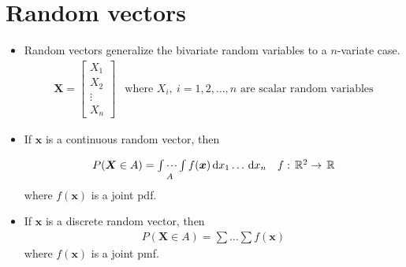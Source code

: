 \documentclass[10pt, twoside, a4paper]{book}
\newcommand{\ud}{\,\mathrm{d}}
\newcommand{\ureal}{\,\mathbb{R}}
\theoremstyle{definition}
\begin{document}
\section{Random vectors}
\begin{itemize}
  \item Random vectors generalize the bivariate random variables to a
  $n$-variate case.
  	\begin{equation*}
	\renewcommand{\arraystretch}{1.6}
	\begin{array}{ll}
	\bm X = \left [
	\begin{matrix}
	X_1 \\ X_2 \\ \vdots \\ X_n
	\end{matrix} \right ] & \text{where $X_i,~i=1,2,\ldots,n$ are scalar random
	variables}
	\end{array}
	\end{equation*}
	\item If $\bm x$ is a continuous random vector, then
	\begin{equation*}
	\renewcommand{\arraystretch}{1.6}
	\begin{array}{ll}
	P(\bm X \in A) = \idotsint\limits_A f(\bm x) \ud x_1 \ldots \ud x_n &
	f: \ureal^2 \to \ureal
	\end{array}
	\end{equation*}
	where $f(\bm x)$ is a joint pdf.
	\item If $\bm x$ is a discrete random vector, then
	\begin{equation*}
	\renewcommand{\arraystretch}{1.6}
	\begin{array}{ll}
	P(\bm X \in A) = \sum \ldots \sum f(\bm x)
	\end{array}
	\end{equation*}
	where $f(\bm x)$ is a joint pmf.


\end{itemize}
\end{document}
